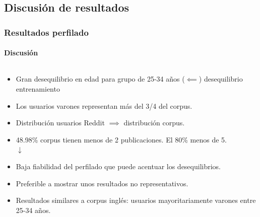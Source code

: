\documentclass{beamer}
\begin{document}
\subsection{Discusión de resultados}
\begin{frame}
	\frametitle{Resultados perfilado}
	\framesubtitle{Discusión}
	\begin{columns}[T]
		\hspace{-3.5cm}
		\begin{column}{\textwidth}
			\begin{description}[labelwidth=0.01mm]
				\item 
				\vspace{-0.75cm}
				\begin{itemize}
					\item<1->Gran desequilibrio en edad para grupo de 25-34 años ($\impliedby$) desequilibrio entrenamiento 
					\item<3-> Los usuarios varones representan más del 3/4 del corpus.
					\item<4-> Distribución usuarios Reddit $\implies$ distribución corpus.
					\item<5-> 48.98\% corpus tienen menos de 2 publicaciones. El 80\% menos de 5.
					\\ \hspace{2cm}$\downarrow$
					\item <6-> Baja fiabilidad del perfilado que puede acentuar los desequilibrios.
					\item <7-> Preferible a mostrar unos resultados no representativos.
					\item<8->  Resultados similares a corpus inglés: usuarios mayoritariamente varones entre 25-34 años.
				\end{itemize}
			\end{description}
			
		\end{column}
				\hspace{-1.5cm}
\end{columns}
\end{frame}
\end{document}
